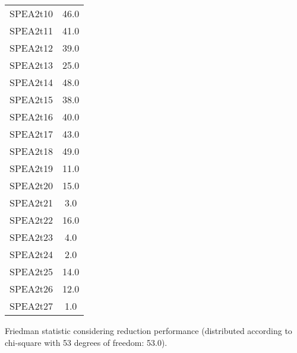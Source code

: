 \documentclass{article}
\begin{document}
\begin{table}[!htp]
\begin{tabular}{c|c}
SPEA2t10&46.0\\
SPEA2t11&41.0\\
SPEA2t12&39.0\\
SPEA2t13&25.0\\
SPEA2t14&48.0\\
SPEA2t15&38.0\\
SPEA2t16&40.0\\
SPEA2t17&43.0\\
SPEA2t18&49.0\\
SPEA2t19&11.0\\
SPEA2t20&15.0\\
SPEA2t21&3.0\\
SPEA2t22&16.0\\
SPEA2t23&4.0\\
SPEA2t24&2.0\\
SPEA2t25&14.0\\
SPEA2t26&12.0\\
SPEA2t27&1.0\\
\end{tabular}
\end{table}


Friedman statistic considering reduction performance (distributed according to chi-square with 53 degrees of freedom: 53.0).
\end{document}
